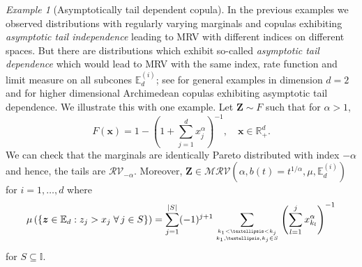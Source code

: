 \documentclass[aos]{imsart}
\numberwithin{equation}{section}
\theoremstyle{plain} %
\theoremstyle{remark}
\newtheorem{example}[theorem]{Example}
\newcommand{\E}{\mathbb{E}}
\newcommand{\R}{\mathbb{R}}
\def\MRV{\mathcal{MRV}}
\def\RV{\mathcal{RV}}
\def\bS{\boldsymbol{S}}
\def\bX{\boldsymbol X}
\def\bZ{\boldsymbol Z}
\def\bx{\boldsymbol x}
\def\bz{\boldsymbol z}
\def\bTheta{\boldsymbol \Theta}
\def\btheta{\boldsymbol \theta}
\begin{document}
\begin{example}[Asymptotically tail dependent copula]\label{ex:cop:dep}
In the previous examples we observed distributions with regularly varying marginals and copulas exhibiting \emph{asymptotic tail independence} leading to MRV with different indices on different spaces. But there are distributions which exhibit so-called \emph{asymptotic tail dependence} which would lead to MRV with the same index, rate function and limit measure on all subcones $\E_d^{(i)}$; see  \cite{heffernan:2000} for general examples in dimension $d=2$ and  \cite{Charpentier:Segers} for higher dimensional Archimedean copulas exhibiting asymptotic tail dependence.  We illustrate this with one example.
Let $\bZ\sim F$ such that for $\alpha>1$,
\[F(\bx) = 1- \left(1+\sum_{j=1}^d x_j^{\alpha}\right)^{-1}, \quad \bx \in \R_+^d.\]
We can check that the marginals are  {identically Pareto distributed with index $-\alpha$} and hence, the tails are $\RV_{-\alpha}$. Moreover,  $\bZ\in \MRV(\alpha, b(t)= t^{1/\alpha}, \mu, \E_d^{(i)})$ for $i=1,\ldots, d$ where 
\begin{eqnarray} \label{eq:mrvasdep:mu}
            \mu\left(\{\bz\in \E_d:z_j>x_j\; \forall\, j \in S\}\right)=\sum_{j=1}^{|S|} (-1)^{j+1} \sum_{\genfrac{}{}{0pt}{}{k_1<\ldots<k_j}{ k_1,\ldots, k_j \in S}} \left(\sum_{l=1}^j x_{k_l}^{\alpha}\right)^{-1}       
\end{eqnarray}
for $S\subseteq \mathbb{I}$.


\end{example}
\end{document}
